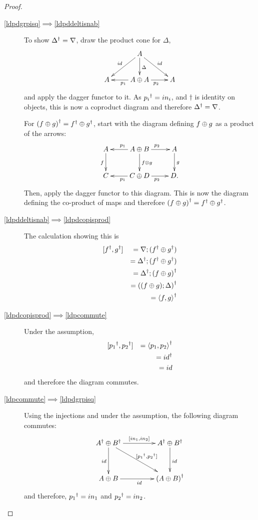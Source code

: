 \begin{proof}
  \begin{description}
    \item[\ref{ldpdgrpisq}$\implies$\ref{ldpddeltisnab}] To show ${\Delta}^{\dagger} = \nabla$,
    draw the product cone for $\Delta$,
    \[
      \xymatrix {
        &A \ar[d]^{\Delta} \ar[dr]^{id} \ar[dl]_{id}\\
        A
         & A\+A \ar[l]^{p_{1}}  \ar[r]_{p_{2}}
         & A
      }
    \]
    and apply the dagger functor to it. As ${p_{i}}^{\dagger} = in_{i}$, and $\dagger$ is identity on
    objects, this is now a coproduct diagram and therefore ${\Delta}^{\dagger} = \nabla$.

    For ${(f\oplus g)}^{\dagger} = {f}^{\dagger}\oplus{g}^{\dagger}$, start with the diagram defining $f\oplus g$ as a product of
    the arrows:
    \[
      \xymatrix{
        A\ar[d]_{f}  & A\+B \ar[l]_{p_{1}} \ar[r]^{p_{2}} \ar[d]^{f\*g}&A \ar[d]^{g}\\
        C & C\+D \ar[l]^{p_{1}} \ar[r]_{p_{2}}  & D.
      }
    \]
    Then, apply the dagger functor to this diagram. This is now the diagram defining the
    co-product of maps and therefore ${(f\oplus g)}^{\dagger} = {f}^{\dagger}\oplus{g}^{\dagger}$.
    \item[\ref{ldpddeltisnab}$\implies$\ref{ldpdcopisprod}] The calculation showing this is
      \begin{eqnarray*}
        &[{f}^{\dagger},{g}^{\dagger}] & = \nabla; ({f}^{\dagger}\oplus{g}^{\dagger})\\
        & &={\Delta}^{\dagger}; ({f}^{\dagger}\oplus{g}^{\dagger})\\
        & &={\Delta}^{\dagger}; {(f\oplus g)}^{\dagger}\\
        & & = {((f\oplus g);\Delta)}^{\dagger}\\
        & & = {\langle f,g\rangle}^{\dagger}
      \end{eqnarray*}
    \item[\ref{ldpdcopisprod}$\implies$\ref{ldpcommute}]
      Under the assumption,
      \begin{eqnarray*}
        &[{p_{1}}^{\dagger},{p_{2}}^{\dagger}] &= {\langle p_{1},p_{2}\rangle}^{\dagger}\\
        &&={id}^{\dagger}\\
        &&=id
      \end{eqnarray*}
      and therefore the diagram commutes.

    \item[\ref{ldpcommute}$\implies$\ref{ldpdgrpisq}] Using the injections and under
    the assumption, the following diagram commutes:
      \[
        \xymatrix @C+20pt @R+10pt{
          \dgr{A} \+ \dgr{B} \ar[d]_{id} \ar[dr]^{[\dgr{p_{1}},\dgr{p_{2}}]}\ar[r]^{[in_{1},in_{2}]}
            & \dgr{A} \+ \dgr{B} \ar[d]^{id}\\
          A\+B\ar[r]_{id}&\dgr{(A\+B)}
        }
      \]
      and therefore, ${p_{1}}^{\dagger} = in_{1}$ and ${p_{2}}^{\dagger} = in_{2}$.
  \end{description}
\end{proof}

